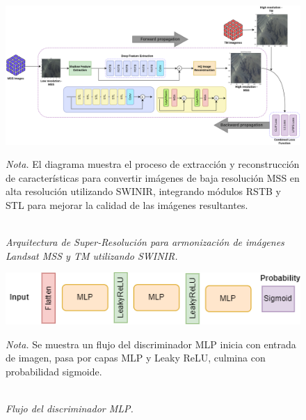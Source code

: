          
                \begin{figure}[H] 
                    \caption{\doublespacing \\ \textit{Arquitectura de Super-Resolución para armonización de imágenes Landsat MSS y TM utilizando SWINIR.}} 
                    \centering
                    \includegraphics[width=1\linewidth]{2_CAPITULO4/IMG/SWINIR.png}
                    \begin{justify}
                        \textit{Nota.} El diagrama muestra el proceso de extracción y reconstrucción de características para convertir imágenes de baja resolución MSS en alta resolución utilizando SWINIR, integrando módulos RSTB y STL para mejorar la calidad de las imágenes resultantes.
                    \end{justify}                    
                    \label{generador}
                \end{figure}
    

                \begin{figure}[H] 
                    \caption{\doublespacing \\ \textit{Flujo del discriminador MLP.}} 
                    \centering
                    \includegraphics[width=0.6\linewidth]{2_CAPITULO5/IMG/mlp_discriminator.png}
                    \begin{justify}
                        \textit{Nota.} Se muestra un flujo del discriminador MLP inicia con entrada de imagen, pasa por capas MLP y Leaky ReLU, culmina con probabilidad sigmoide.
                    \end{justify}                    
                    \label{discriminador}
                \end{figure}

